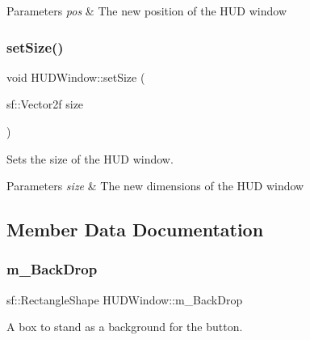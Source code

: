 \begin{DoxyParams}{Parameters}
{\em pos} & The new position of the H\+UD window \\
\hline
\end{DoxyParams}
\mbox{\label{class_h_u_d_window_a764ef0d5ea029cdf09b62af0f59ef74f}} 
\subsubsection{\texorpdfstring{set\+Size()}{setSize()}}
{\footnotesize\ttfamily void H\+U\+D\+Window\+::set\+Size (\begin{DoxyParamCaption}\item[{sf\+::\+Vector2f}]{size }\end{DoxyParamCaption})}



Sets the size of the H\+UD window. 


\begin{DoxyParams}{Parameters}
{\em size} & The new dimensions of the H\+UD window \\
\hline
\end{DoxyParams}


\subsection{Member Data Documentation}
\mbox{\label{class_h_u_d_window_acac66ce4a62cd00c2b23045c7b195244}} 
\subsubsection{\texorpdfstring{m\+\_\+\+Back\+Drop}{m\_BackDrop}}
{\footnotesize\ttfamily sf\+::\+Rectangle\+Shape H\+U\+D\+Window\+::m\+\_\+\+Back\+Drop\hspace{0.3cm}{\ttfamily [private]}}



A box to stand as a background for the button. 

\mbox{\label{class_h_u_d_window_a6a019f798171deebfb65328d0fbad30c}} 
